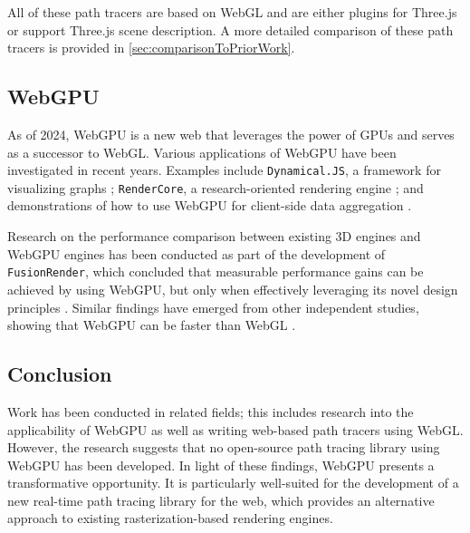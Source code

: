 All of these path tracers are based on \gls{WebGL} and are either plugins for \gls{Three.js} or support \gls{Three.js} scene description. A more detailed comparison of these path tracers is provided in \autoref{sec:comparisonToPriorWork}.

\subsection*{WebGPU}

As of 2024, \gls{WebGPU} is a new web  that leverages the power of \glspl{GPU} and serves as a successor to \gls{WebGL}. Various applications of \gls{WebGPU} have been investigated in recent years. Examples include \texttt{Dynamical.JS}, a framework for visualizing graphs \cite{dotson2022dynamicaljs}; \texttt{RenderCore}, a research-oriented rendering engine \cite{Bohak_Kovalskyi_Linev_Mrak_Tadel_Strban_Tadel_Yagil_2024}; and demonstrations of how to use \gls{WebGPU} for client-side data aggregation \cite{kimmersdorfer2023webgpu}.

Research on the performance comparison between existing 3D engines and \gls{WebGPU} engines has been conducted as part of the development of \texttt{FusionRender}, which concluded that measurable performance gains can be achieved by using \gls{WebGPU}, but only when effectively leveraging its novel design principles \cite{fusionRenderWebGPU}. Similar findings have emerged from other independent studies, showing that \gls{WebGPU} can be faster than \gls{WebGL} \cite{webGPUWebGis, fransson2023performance, CHICKERUR2024919}.

\subsection*{Conclusion}

Work has been conducted in related fields; this includes research into the applicability of \gls{WebGPU} as well as writing web-based path tracers using \gls{WebGL}. However, the research suggests that no open-source path tracing library using \gls{WebGPU} has been developed. In light of these findings, \gls{WebGPU} presents a transformative opportunity. It is particularly well-suited for the development of a new real-time path tracing library for the web, which provides an alternative approach to existing rasterization-based rendering engines.
